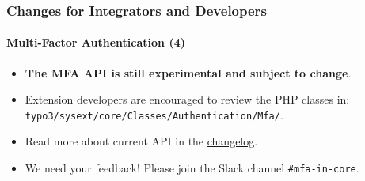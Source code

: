 %

\begin{frame}[fragile]
	\frametitle{Changes for Integrators and Developers}
	\framesubtitle{Multi-Factor Authentication (4)}

	\begin{itemize}
		\item \textbf{The MFA API is still experimental and subject to change}.
		\item Extension developers are encouraged to review the PHP classes in:\newline
			\small\texttt{typo3/sysext/core/Classes/Authentication/Mfa/}.\normalsize
		\item Read more about current API in the
			\href{https://docs.typo3.org/c/typo3/cms-core/master/en-us/Changelog/11.1/Feature-93526-MultiFactorAuthentication.rst}{changelog}.
		\item We need your feedback! Please join the Slack channel \texttt{\#mfa-in-core}.
	\end{itemize}

\end{frame}

